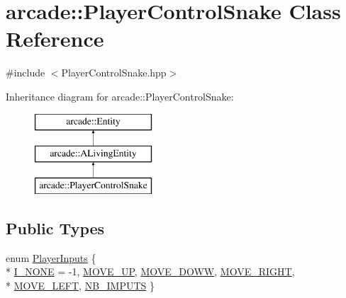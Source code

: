 \hypertarget{classarcade_1_1_player_control_snake}{\section{arcade\-:\-:Player\-Control\-Snake Class Reference}
\label{classarcade_1_1_player_control_snake}
}


{\ttfamily \#include $<$Player\-Control\-Snake.\-hpp$>$}

Inheritance diagram for arcade\-:\-:Player\-Control\-Snake\-:\begin{figure}[H]
\begin{center}
\leavevmode
\includegraphics[height=3.000000cm]{classarcade_1_1_player_control_snake}
\end{center}
\end{figure}
\subsection*{Public Types}
\begin{DoxyCompactItemize}
\item 
enum \hyperlink{classarcade_1_1_player_control_snake_a96f388c5ab92cf0eb8efb6654d73cf05}{Player\-Inputs} \{ \\*
\hyperlink{classarcade_1_1_player_control_snake_a96f388c5ab92cf0eb8efb6654d73cf05ab7542f6493fb0ea39eeda5ae2b4d9230}{I\-\_\-\-N\-O\-N\-E} = -\/1, 
\hyperlink{classarcade_1_1_player_control_snake_a96f388c5ab92cf0eb8efb6654d73cf05a11956656dc8c2a07eefb0712cb082b2e}{M\-O\-V\-E\-\_\-\-U\-P}, 
\hyperlink{classarcade_1_1_player_control_snake_a96f388c5ab92cf0eb8efb6654d73cf05af1a517ab6ccd222b938cbc3d73337b71}{M\-O\-V\-E\-\_\-\-D\-O\-W\-W}, 
\hyperlink{classarcade_1_1_player_control_snake_a96f388c5ab92cf0eb8efb6654d73cf05a4485f90c2474a66045b50ead44addf84}{M\-O\-V\-E\-\_\-\-R\-I\-G\-H\-T}, 
\\*
\hyperlink{classarcade_1_1_player_control_snake_a96f388c5ab92cf0eb8efb6654d73cf05aa3f6a0a943184440460bbbab5ab8f79f}{M\-O\-V\-E\-\_\-\-L\-E\-F\-T}, 
\hyperlink{classarcade_1_1_player_control_snake_a96f388c5ab92cf0eb8efb6654d73cf05aa5b7d4275cb817693c56b89af03f5a99}{N\-B\-\_\-\-I\-M\-P\-U\-T\-S}
 \}
\end{DoxyCompactItemize}
